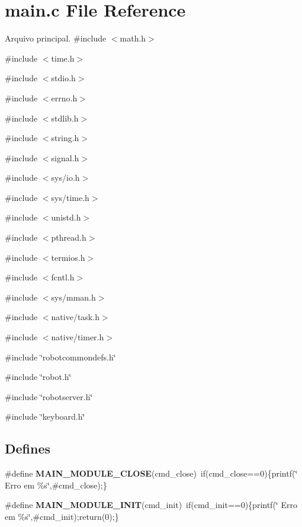 \section{main.c File Reference}
\label{main_8c}


Arquivo principal.  
{\ttfamily \#include $<$math.h$>$}\par
{\ttfamily \#include $<$time.h$>$}\par
{\ttfamily \#include $<$stdio.h$>$}\par
{\ttfamily \#include $<$errno.h$>$}\par
{\ttfamily \#include $<$stdlib.h$>$}\par
{\ttfamily \#include $<$string.h$>$}\par
{\ttfamily \#include $<$signal.h$>$}\par
{\ttfamily \#include $<$sys/io.h$>$}\par
{\ttfamily \#include $<$sys/time.h$>$}\par
{\ttfamily \#include $<$unistd.h$>$}\par
{\ttfamily \#include $<$pthread.h$>$}\par
{\ttfamily \#include $<$termios.h$>$}\par
{\ttfamily \#include $<$fcntl.h$>$}\par
{\ttfamily \#include $<$sys/mman.h$>$}\par
{\ttfamily \#include $<$native/task.h$>$}\par
{\ttfamily \#include $<$native/timer.h$>$}\par
{\ttfamily \#include \char`\"{}robotcommondefs.h\char`\"{}}\par
{\ttfamily \#include \char`\"{}robot.h\char`\"{}}\par
{\ttfamily \#include \char`\"{}robotserver.h\char`\"{}}\par
{\ttfamily \#include \char`\"{}keyboard.h\char`\"{}}\par
\subsection*{Defines}
\begin{DoxyCompactItemize}
\item 
\#define {\bf MAIN\_\-MODULE\_\-CLOSE}(cmd\_\-close)~if(cmd\_\-close==0)\{printf(\char`\"{}    Erro em \%s\char`\"{},\#cmd\_\-close);\}
\item 
\#define {\bf MAIN\_\-MODULE\_\-INIT}(cmd\_\-init)~if(cmd\_\-init==0)\{printf(\char`\"{}    Erro em \%s\char`\"{},\#cmd\_\-init);return(0);\}
\end{DoxyCompactItemize}

